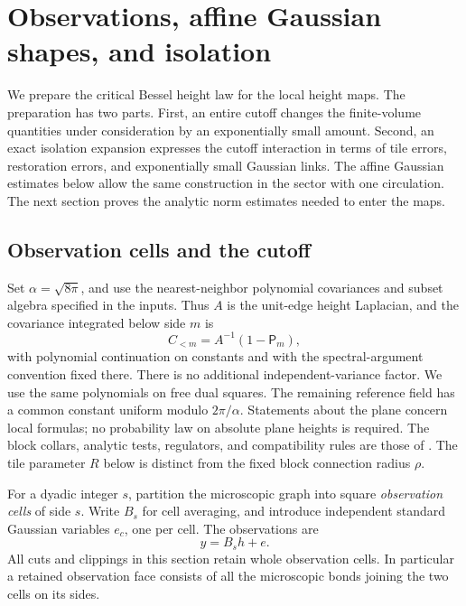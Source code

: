 \section{Observations, affine Gaussian shapes, and isolation}
\label{sec:preparation}

We prepare the critical Bessel height law for the local height maps.
The preparation has two parts.  First, an entire cutoff changes the
finite-volume quantities under consideration by an exponentially small
amount.  Second, an exact isolation expansion expresses the cutoff
interaction in terms of tile errors, restoration errors, and exponentially
small Gaussian links.  The affine Gaussian estimates below allow the same
construction in the sector with one circulation.  The next section proves
the analytic norm estimates needed to enter the maps.

\subsection{Observation cells and the cutoff}
\label{prep:geometry}

Set $\alpha=\sqrt{8\pi}$, and use the nearest-neighbor polynomial
covariances and subset algebra specified in the inputs.  Thus $A$ is the
unit-edge height Laplacian, and the covariance integrated below side $m$
is
\begin{equation}\label{prep:entry-covariance}
 C_{<m}=A^{-1}(1-\mathsf P_m),
\end{equation}
with polynomial continuation on constants and with the spectral-argument
convention fixed there.  There is no additional independent-variance
factor.  We use the same polynomials on free dual squares.  The remaining
reference field has a common constant uniform modulo $2\pi/\alpha$.
Statements about the plane concern local formulas; no probability law on
absolute plane heights is required.  The block collars, analytic tests,
regulators, and compatibility rules are those of \cite[Sections
9, 8, and 4]{B}.
The tile parameter $R$ below is distinct from the fixed block connection
radius $\rho$.

For a dyadic integer $s$, partition the microscopic graph into square
\emph{observation cells} of side $s$.  Write $B_s$ for cell averaging, and
introduce independent standard Gaussian variables $e_c$, one per cell.
The observations are
\begin{equation}\label{prep:observations}
                  y=B_s h+e.
\end{equation}
All cuts and clippings in this section retain whole observation cells.
In particular a retained observation face consists of all the microscopic
bonds joining the two cells on its sides.

